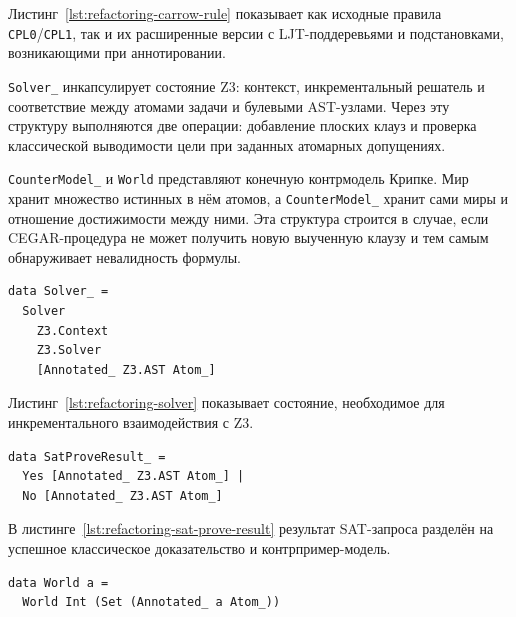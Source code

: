 \documentclass[14pt, russian]{scrartcl}
\begin{document}
Листинг~\ref{lst:refactoring-carrow-rule} показывает как исходные правила
\texttt{CPL0}/\texttt{CPL1}, так и их расширенные версии с LJT-поддеревьями и
подстановками, возникающими при аннотировании.

\texttt{Solver\_} инкапсулирует состояние Z3: контекст, инкрементальный
решатель и соответствие между атомами задачи и булевыми AST-узлами. Через эту
структуру выполняются две операции: добавление плоских клауз и проверка
классической выводимости цели при заданных атомарных допущениях.

\texttt{CounterModel\_} и \texttt{World} представляют конечную контрмодель
Крипке. Мир хранит множество истинных в нём атомов, а \texttt{CounterModel\_}
хранит сами миры и отношение достижимости между ними. Эта структура строится в
случае, если CEGAR-процедура не может получить новую выученную клаузу и тем
самым обнаруживает невалидность формулы.

\begin{listing}[!htb]
\caption{Состояние решателя \texttt{Solver\_}}
\label{lst:refactoring-solver}
\begin{verbatim}
data Solver_ =
  Solver
    Z3.Context
    Z3.Solver
    [Annotated_ Z3.AST Atom_]
\end{verbatim}
\end{listing}

Листинг~\ref{lst:refactoring-solver} показывает состояние, необходимое для
инкрементального взаимодействия с Z3.

\begin{listing}[!htb]
\caption{Результат SAT-проверки \texttt{SatProveResult\_}}
\label{lst:refactoring-sat-prove-result}
\begin{verbatim}
data SatProveResult_ =
  Yes [Annotated_ Z3.AST Atom_] |
  No [Annotated_ Z3.AST Atom_]
\end{verbatim}
\end{listing}

В листинге~\ref{lst:refactoring-sat-prove-result} результат SAT-запроса
разделён на успешное классическое доказательство и контрпример-модель.

\begin{listing}[!htb]
\caption{Мир контрмодели \texttt{World}}
\label{lst:refactoring-world}
\begin{verbatim}
data World a =
  World Int (Set (Annotated_ a Atom_))
\end{verbatim}
\end{listing}
\end{document}
